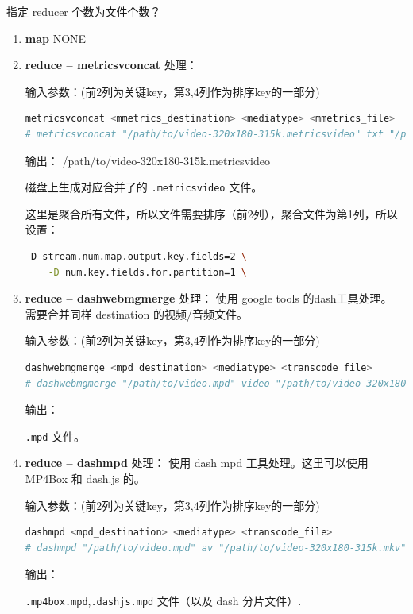 指定 reducer 个数为文件个数？


\begin{enumerate}
  \item \textbf{map}
NONE


  \item \textbf{reduce -- metricsvconcat}
处理：

输入参数：(前2列为关键key，第3,4列作为排序key的一部分)
\begin{lstlisting}[language=bash]
metricsvconcat <mmetrics_destination> <mediatype> <mmetrics_file>
# metricsvconcat "/path/to/video-320x180-315k.metricsvideo" txt "/path/to/tmp/video-320x180-315k-0000000000000000000.1920x1080.metricsvideo"
\end{lstlisting}

输出：
/path/to/video-320x180-315k.metricsvideo

磁盘上生成对应合并了的 \texttt{.metricsvideo} 文件。

这里是聚合所有文件，所以文件需要排序（前2列），聚合文件为第1列，所以设置：

\begin{lstlisting}[language=bash]
    -D stream.num.map.output.key.fields=2 \
    -D num.key.fields.for.partition=1 \
\end{lstlisting}




  \item \textbf{reduce -- dashwebmgmerge}
处理：
使用 google tools 的dash工具处理。
需要合并同样 destination 的视频/音频文件。


输入参数：(前2列为关键key，第3,4列作为排序key的一部分)
\begin{lstlisting}[language=bash]
dashwebmgmerge <mpd_destination> <mediatype> <transcode_file>
# dashwebmgmerge "/path/to/video.mpd" video "/path/to/video-320x180-315k.mkv"
\end{lstlisting}

输出：

\texttt{.mpd} 文件。



  \item \textbf{reduce -- dashmpd}
处理：
使用 dash mpd 工具处理。这里可以使用 MP4Box 和 dash.js 的。

输入参数：(前2列为关键key，第3,4列作为排序key的一部分)
\begin{lstlisting}[language=bash]
dashmpd <mpd_destination> <mediatype> <transcode_file>
# dashmpd "/path/to/video.mpd" av "/path/to/video-320x180-315k.mkv"
\end{lstlisting}

输出：

\texttt{.mp4box.mpd},\texttt{.dashjs.mpd} 文件（以及 dash 分片文件）.


\end{enumerate}



